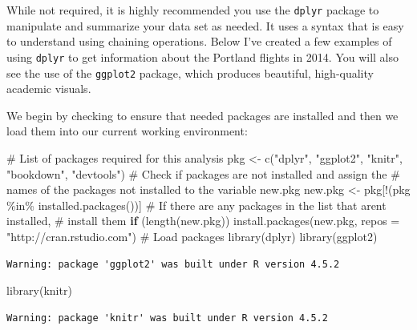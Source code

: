 \documentclass[
  letterpaper,
  12pt,
  twoside]{book}
\newenvironment{Shaded}{\begin{snugshade}}{\end{snugshade}}
\newcommand{\AttributeTok}[1]{\textcolor[rgb]{0.40,0.45,0.13}{#1}}
\newcommand{\CommentTok}[1]{\textcolor[rgb]{0.37,0.37,0.37}{#1}}
\newcommand{\ControlFlowTok}[1]{\textcolor[rgb]{0.00,0.23,0.31}{\textbf{#1}}}
\newcommand{\FunctionTok}[1]{\textcolor[rgb]{0.28,0.35,0.67}{#1}}
\newcommand{\NormalTok}[1]{\textcolor[rgb]{0.00,0.23,0.31}{#1}}
\newcommand{\OtherTok}[1]{\textcolor[rgb]{0.00,0.23,0.31}{#1}}
\newcommand{\SpecialCharTok}[1]{\textcolor[rgb]{0.37,0.37,0.37}{#1}}
\newcommand{\StringTok}[1]{\textcolor[rgb]{0.13,0.47,0.30}{#1}}
\begin{document}
While not required, it is highly recommended you use the \texttt{dplyr}
package to manipulate and summarize your data set as needed. It uses a
syntax that is easy to understand using chaining operations. Below I've
created a few examples of using \texttt{dplyr} to get information about
the Portland flights in 2014. You will also see the use of the
\texttt{ggplot2} package, which produces beautiful, high-quality
academic visuals.

We begin by checking to ensure that needed packages are installed and
then we load them into our current working environment:

\begin{Shaded}
\begin{Highlighting}[]
\CommentTok{\# List of packages required for this analysis}
\NormalTok{pkg }\OtherTok{\textless{}{-}} \FunctionTok{c}\NormalTok{(}\StringTok{"dplyr"}\NormalTok{, }\StringTok{"ggplot2"}\NormalTok{, }\StringTok{"knitr"}\NormalTok{, }\StringTok{"bookdown"}\NormalTok{, }\StringTok{"devtools"}\NormalTok{)}
\CommentTok{\# Check if packages are not installed and assign the}
\CommentTok{\# names of the packages not installed to the variable new.pkg}
\NormalTok{new.pkg }\OtherTok{\textless{}{-}}\NormalTok{ pkg[}\SpecialCharTok{!}\NormalTok{(pkg }\SpecialCharTok{\%in\%} \FunctionTok{installed.packages}\NormalTok{())]}
\CommentTok{\# If there are any packages in the list that aren\textquotesingle{}t installed,}
\CommentTok{\# install them}
\ControlFlowTok{if}\NormalTok{ (}\FunctionTok{length}\NormalTok{(new.pkg))}
  \FunctionTok{install.packages}\NormalTok{(new.pkg, }\AttributeTok{repos =} \StringTok{"http://cran.rstudio.com"}\NormalTok{)}
\CommentTok{\# Load packages}
\FunctionTok{library}\NormalTok{(dplyr)}
\FunctionTok{library}\NormalTok{(ggplot2)}
\end{Highlighting}
\end{Shaded}

\begin{verbatim}
Warning: package 'ggplot2' was built under R version 4.5.2
\end{verbatim}

\begin{Shaded}
\begin{Highlighting}[]
\FunctionTok{library}\NormalTok{(knitr)}
\end{Highlighting}
\end{Shaded}

\begin{verbatim}
Warning: package 'knitr' was built under R version 4.5.2
\end{verbatim}
\end{document}
